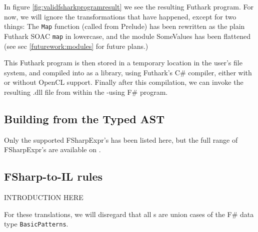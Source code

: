 In figure \ref{fig:validfsharkprogramresult} we see the resulting Futhark program.
For now, we will ignore the transformations that have happened, except for two
things: The \texttt{Map} function (called from \fshark{}Prelude) has been rewritten
as the plain Futhark SOAC \texttt{map} in lowercase, and the module SomeValues has been
flattened (see sec \ref{futurework:modules} for future plans.)

This Futhark program is then stored in a temporary location in the user's file
system, and compiled into as a library, using Futhark's C\# compiler, either
with or without OpenCL support. Finally after this compilation, we can invoke
the resulting .dll file from within the \fshark{}-using F\# program.

\subsection*{Building \fshark{} from the Typed AST}
\label{sec:fsharkcompilerrules}
Only the supported FSharpExpr's has been listed here, but the full range of
FSharpExpr's are available on \cite{typedtree}.

\subsection*{FSharp-to-\fshark{}IL rules}
INTRODUCTION HERE

For these translations, we will disregard that all \fsharpexpr{}s are union
cases of the F\# data type \texttt{BasicPatterns}.


